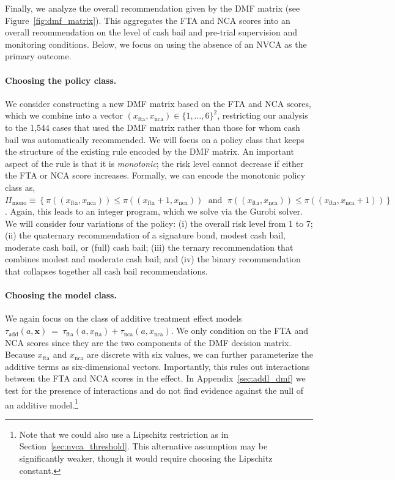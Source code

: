 \documentclass[12pt]{article}
\theoremstyle{definition}
\newcommand{\bx}{\bm x}
\newcommand{\<}{\langle}
\renewcommand{\>}{\rangle}
\begin{document}
Finally, we analyze the overall recommendation given by the DMF matrix
(see Figure~\ref{fig:dmf_matrix}). This aggregates the FTA and NCA
scores into an overall recommendation on the level of cash bail and
pre-trial supervision and monitoring conditions.  Below, we focus on
using the absence of an NVCA as the primary outcome.

\paragraph{Choosing the policy class.}
We consider constructing a new DMF matrix based on the FTA and NCA
scores, which we combine into a vector
$(x_{\text{fta}}, x_{\text{nca}}) \in \{1,\ldots,6\}^2$, restricting
our analysis to the 1,544 cases that used the DMF matrix rather than
those for whom cash bail was automatically recommended. We will focus on a
policy class that keeps the structure of the existing rule encoded by
the DMF matrix. An important aspect of the rule is that it is
\emph{monotonic}; the risk level cannot decrease if either the FTA or
NCA score increases.  Formally, we can encode the monotonic policy
class as,
$ \Pi_{\text{mono}} \equiv \left\{\pi((x_{\text{fta}},
  x_{\text{nca}})) \leq \pi((x_{\text{fta}} + 1, x_{\text{nca}})) \;
  \text{ and } \; \pi((x_{\text{fta}}, x_{\text{nca}})) \leq
  \pi((x_{\text{fta}}, x_{\text{nca}} + 1))\right\}$.  Again, this
leads to an integer program, which we solve via the Gurobi solver. We
will consider four variations of the policy: (i) the overall
risk level from 1 to 7; (ii) the quaternary recommendation of a signature bond,
modest cash bail, moderate cash bail, or (full) cash bail; (iii) the ternary
recommendation that combines modest and moderate cash bail; and (iv) the binary
recommendation that
collapses together all cash bail recommendations.




\paragraph{Choosing the model class.}
We again focus on the class of additive treatment effect models
$\tau_{\text{add}}(a,\bx) \ = \ \tau_{\text{fta}}(a, x_{\text{fta}}) +
\tau_{\text{nca}}(a, x_{\text{nca}})$.  We only condition on the FTA
and NCA scores since they are the two components of the DMF decision
matrix.  Because $x_{\text{fta}}$ and $x_{\text{nca}}$ are discrete
with six values, we can further parameterize the additive terms as
six-dimensional vectors. Importantly, this rules out interactions
between the FTA and NCA scores in the effect. In Appendix~\ref{sec:addl_dmf}
we test for the presence of interactions and do not find evidence against
the null of an additive model.\footnote{Note that we
  could also use a Lipschitz restriction as in
  Section~\ref{sec:nvca_threshold}.  This alternative assumption may
  be significantly weaker, though it would require choosing the
  Lipschitz constant.}
\end{document}
